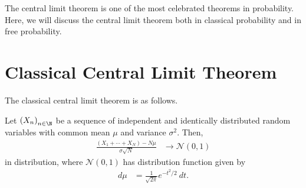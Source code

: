 \documentclass[10pt]{mypackage}
\begin{document}
\RaggedRight
The central limit theorem is one of the most celebrated theorems in probability. Here, we will discuss the central limit theorem both in classical probability and in free probability.
\section{Classical Central Limit Theorem}%
The classical central limit theorem is as follows.
\begin{theorem}
  Let $\left( X_n \right)_{n\in \N}$ be a sequence of independent and identically distributed random variables with common mean $\mu$ and variance $\sigma^2$. Then,
  \begin{align*}
    \frac{\left( X_1 + \cdots + X_N \right) - N\mu}{\sigma\sqrt{N}} &\rightarrow \mathcal{N}\left( 0,1 \right)
  \end{align*}
  in distribution, where $\mathcal{N}\left( 0,1 \right)$ has distribution function given by
  \begin{align*}
    d\mu &= \frac{1}{\sqrt{2\pi}} e^{-t^2/2}\:dt.
  \end{align*}
\end{theorem}
\end{document}
